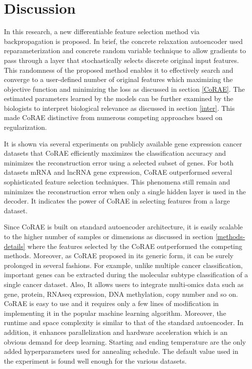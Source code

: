 \documentclass{bioinfo}
\begin{document}
{\section{Discussion}
In this research, a new differentiable feature selection method via backpropagation is proposed. In brief, the concrete relaxation autoencoder used reparameterization and concrete random variable technique to allow gradients to pass through a layer that stochastically selects discrete original input features. This randomness of the proposed method enables it to effectively search and converge to a user-defined number of original features which maximizing the objective function and minimizing the loss as discussed in section \ref{CoRAE}. The estimated parameters learned by the models can be further examined by the biologists to interpret biological relevance as discussed in section \ref{inter}. This made CoRAE distinctive from numerous competing approaches based on regularization. 

It is shown via several experiments on publicly available gene expression cancer datasets that CoRAE efficiently maximizes the classification accuracy and minimizes the reconstruction error using a selected subset of genes.  For both datasets mRNA and lncRNA gene expression, CoRAE outperformed several sophisticated feature selection techniques. This phenomena still remain and minimizes the reconstruction error when only a single hidden layer is used in the decoder.  It indicates the power of CoRAE in selecting features from a large dataset. 

Since CoRAE is built on standard autoencoder architecture, it is easily scalable to the higher number of samples or dimensions as discussed in section \ref{methods-details} where the features selected by the CoRAE outperformed the competing methods. Moreover, as CoRAE proposed in its generic form, it can be surely prolonged in several fashions. For example, unlike multiple cancer classification, important genes can be extracted during the molecular subtype classification of a single cancer dataset. Also, It allows users to integrate multi-omics data such as gene, protein, RNAseq expression, DNA methylation, copy number and so on. 
CoRAE is easy to use and it requires only a few lines of modification in implementing it in the popular machine learning algorithm. Moreover, the runtime and space complexity is similar to that of the standard autoencoder. In addition, it enhances parallelization and hardware acceleration which is an obvious demand for deep learning.  Starting and ending temperature are the only added hyperparameters used for annealing schedule. The default value used in the experiment is found well enough for the various datasets.

}
\end{document}
